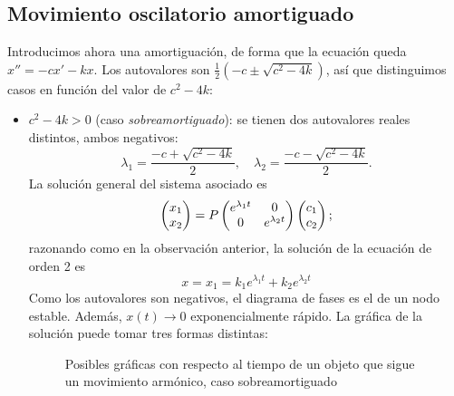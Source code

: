 \documentclass[../ecuaciones_diferenciales.tex]{subfiles}
\begin{document}
\subsection{Movimiento oscilatorio amortiguado}
Introducimos ahora una amortiguación, de forma que la ecuación queda
\(x'' = - cx' - kx\). Los autovalores son \(\frac{1}{2}(-c \pm \sqrt{c^2-4k})\), así
que distinguimos casos en función del valor de \(c^2-4k\):
\begin{itemize}
	\item \(c^2-4k > 0\) (caso \emph{sobreamortiguado}): se tienen dos autovalores
	      reales distintos, ambos negativos:
	      \[\lambda_1 = \frac{-c + \sqrt{c^2-4k}}{2}, \quad \lambda_2 = \frac{-c -
			      \sqrt{c^2-4k}}{2}.\]
	      La solución general del sistema asociado es
	      \[\begin{pmatrix}x_1 \\ x_2\end{pmatrix} = P \begin{pmatrix}e^{\lambda_1 t} & 0 \\ 0 & e^{\lambda_2 t}\end{pmatrix} \begin{pmatrix}c_1
			      \\ c_2\end{pmatrix};\]
	      razonando como en la observación anterior, la solución de la ecuación de
	      orden 2 es
	      \[x = x_1 = k_1e^{\lambda_1 t} + k_2e^{\lambda_2 t}\]
	      Como los autovalores son negativos, el diagrama de fases es el de un nodo
	      estable. Además, \(x(t) \to 0\) exponencialmente rápido. La gráfica de la
	      solución puede tomar tres formas distintas:
	      \begin{figure}[ht]
		      \centering
		      \begin{subfigure}{0.33\textwidth}
			      \centering
		      \end{subfigure}%
		      \begin{subfigure}{0.33\textwidth}
			      \centering
		      \end{subfigure}%
		      \begin{subfigure}{0.33\textwidth}
			      \centering
		      \end{subfigure}
			\caption{Posibles gráficas con respecto al tiempo de un objeto que
			  sigue un movimiento armónico, caso sobreamortiguado}
	      \end{figure}


\end{itemize}
\end{document}
